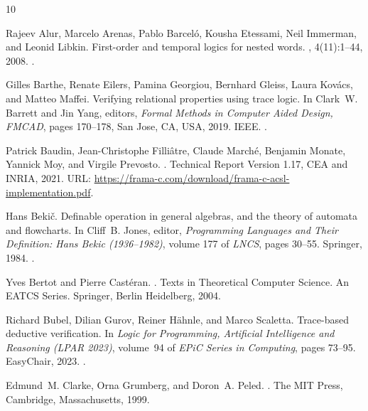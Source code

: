 \documentclass[10pt,a4paper]{amsart}
\theoremstyle{definition}
\begin{document}
\begin{thebibliography}{10}

Rajeev Alur, Marcelo Arenas, Pablo Barcel{\'{o}}, Kousha Etessami, Neil
  Immerman, and Leonid Libkin.
\newblock First-order and temporal logics for nested words.
, 4(11):1--44, 2008.
\newblock \href {https://doi.org/10.2168/LMCS-4(4:11)2008}
  {}.

Gilles Barthe, Renate Eilers, Pamina Georgiou, Bernhard Gleiss, Laura
  Kov{\'{a}}cs, and Matteo Maffei.
\newblock Verifying relational properties using trace logic.
\newblock In Clark~W. Barrett and Jin Yang, editors, {\em Formal Methods in
  Computer Aided Design, {FMCAD}}, pages 170--178, San Jose, CA, USA, 2019.
  {IEEE}.
\newblock \href {https://doi.org/10.23919/FMCAD.2019.8894277}
  {}.

Patrick Baudin, Jean-Christophe Filli{\^a}tre, Claude March{\'e}, Benjamin
  Monate, Yannick Moy, and Virgile Prevosto.
.
\newblock Technical Report Version 1.17, CEA and INRIA, 2021.
\newblock URL:
  \url{https://frama-c.com/download/frama-c-acsl-implementation.pdf}.

Hans Beki{\v{c}}.
\newblock Definable operation in general algebras, and the theory of automata
  and flowcharts.
\newblock In Cliff~B. Jones, editor, {\em Programming Languages and Their
  Definition: {Hans Bekic} {(1936--1982)}}, volume 177 of {\em LNCS}, pages
  30--55. Springer, 1984.
\newblock \href {https://doi.org/10.1007/BFb0048939}
  {}.

Yves Bertot and Pierre Cast{\'{e}}ran.
.
\newblock Texts in Theoretical Computer Science. An {EATCS} Series. Springer,
  Berlin Heidelberg, 2004.

Richard Bubel, Dilian Gurov, Reiner H{\"{a}}hnle, and Marco Scaletta.
\newblock Trace-based deductive verification.
\newblock In {\em Logic for Programming, Artificial Intelligence and Reasoning
  (LPAR 2023)}, volume~94 of {\em EPiC Series in Computing}, pages 73--95.
  EasyChair, 2023.
\newblock \href {https://doi.org/10.29007/VDFD} {}.

Edmund~M. Clarke, Orna Grumberg, and Doron~A. Peled.
.
\newblock The {MIT} Press, Cambridge, Massachusetts, 1999.


\end{thebibliography}
\end{document}
